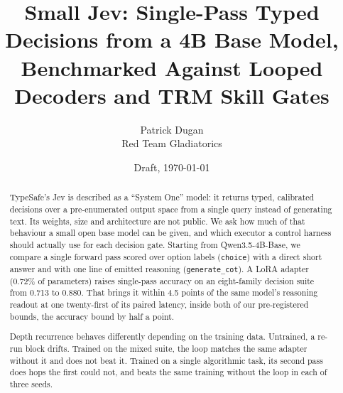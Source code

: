 \documentclass[11pt]{article}
\title{Small Jev: Single-Pass Typed Decisions from a 4B Base Model,\\
Benchmarked Against Looped Decoders and TRM Skill Gates}
\author{Patrick Dugan\\Red Team Gladiatorics}
\date{Draft, \today}
\newcommand{\choiceR}{\texttt{choice}}
\newcommand{\cotR}{\texttt{generate\_cot}}
\begin{document}
\maketitle

\begin{abstract}
TypeSafe's Jev is described as a ``System One'' model: it returns typed, calibrated decisions over
a pre-enumerated output space from a single query instead of generating text. Its weights, size and
architecture are not public. We ask how much of that behaviour a small open base model can be
given, and which executor a control harness should actually use for each decision gate. Starting
from Qwen3.5-4B-Base, we compare a single forward pass scored over option labels (\choiceR) with a
direct short answer and with one line of emitted reasoning (\cotR). A LoRA adapter (0.72\% of
parameters) raises single-pass accuracy on an eight-family decision suite from 0.713 to 0.880. That
brings it within 4.5 points of the same model's reasoning readout at one twenty-first of its paired
latency, inside both of our pre-registered bounds, the accuracy bound by half a point.

Depth recurrence behaves differently depending on the training data. Untrained, a re-run block
drifts. Trained on the mixed suite, the loop matches the same adapter without it and does not beat
it. Trained on a single algorithmic task, its second pass does hops the first could not, and
beats the same training without the loop in each of three seeds.


\end{abstract}
\end{document}
